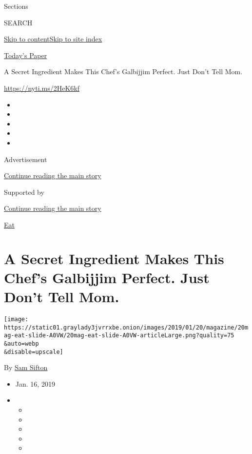 Sections

SEARCH

\protect\hyperlink{site-content}{Skip to
content}\protect\hyperlink{site-index}{Skip to site index}

\href{https://myaccount.nytimes3xbfgragh.onion/auth/login?response_type=cookie\&client_id=vi}{}

\href{https://www.nytimes3xbfgragh.onion/section/todayspaper}{Today's
Paper}

A Secret Ingredient Makes This Chef's Galbijjim Perfect. Just Don't Tell
Mom.

\url{https://nyti.ms/2HeK6kf}

\begin{itemize}
\item
\item
\item
\item
\item
\end{itemize}

Advertisement

\protect\hyperlink{after-top}{Continue reading the main story}

Supported by

\protect\hyperlink{after-sponsor}{Continue reading the main story}

\href{/column/magazine-eat}{Eat}

\hypertarget{a-secret-ingredient-makes-this-chefs-galbijjim-perfect-just-dont-tell-mom}{%
\section{A Secret Ingredient Makes This Chef's Galbijjim Perfect. Just
Don't Tell
Mom.}\label{a-secret-ingredient-makes-this-chefs-galbijjim-perfect-just-dont-tell-mom}}

\texttt{[image: https://static01.graylady3jvrrxbe.onion/images/2019/01/20/magazine/20mag-eat-slide-A0VW/20mag-eat-slide-A0VW-articleLarge.png?quality=75\\\&auto=webp\\\&disable=upscale]}

By \href{https://www.nytimes3xbfgragh.onion/by/sam-sifton}{Sam Sifton}

\begin{itemize}
\item
  Jan. 16, 2019
\item
  \begin{itemize}
  \item
  \item
  \item
  \item
  \item
  \end{itemize}
\end{itemize}

